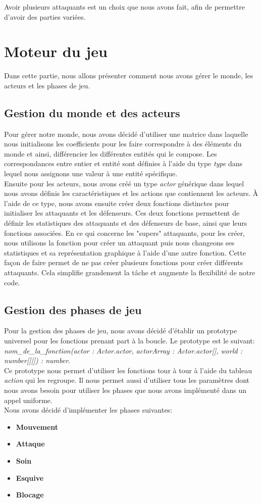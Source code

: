 \documentclass{article}
\begin{document}
Avoir plusieurs attaquants est un choix que nous avons fait, afin de permettre d'avoir des parties variées.
\newpage
\section{Moteur du jeu}
Dans cette partie, nous allons présenter comment nous avons gérer le monde, les acteurs et les phases de jeu.
\label{engine}

\subsection{Gestion du monde et des acteurs}
Pour gérer notre monde, nous avons décidé d'utiliser une matrice dans laquelle nous initialisons les coefficients pour les faire correspondre à des éléments du monde et ainsi, différencier les différentes entités qui le compose. Les correspondances entre entier et entité sont définies à l'aide du type \textit{type} dans lequel nous assignons une valeur à une entité spécifique.
\\Ensuite pour les acteurs, nous avons créé un type \textit{actor} générique dans lequel nous avons définis les caractéristiques et les actions que contiennent les acteurs. À l'aide de ce type, nous avons ensuite créer deux fonctions distinctes pour initialiser les attaquants et les défenseurs. Ces deux fonctions permettent de définir les statistiques des attaquants et des défenseurs de base, ainsi que leurs fonctions associées. En ce qui concerne les "supers" attaquants, pour les créer, nous utilisons la fonction pour créer un attaquant puis nous changeons ses statistiques et sa représentation graphique à l'aide d'une autre fonction. Cette façon de faire permet de ne pas créer plusieurs fonctions pour créer différents attaquants. Cela simplifie grandement la tâche et augmente la flexibilité de notre code.
\subsection{Gestion des phases de jeu}
Pour la gestion des phases de jeu, nous avons décidé d'établir un prototype universel pour les fonctions prenant part à la boucle. Le prototype est le suivant: \\\textit{nom\_de\_la\_fonction(actor : Actor.actor, actorArray : Actor.actor[], world : number[][]) : number}.
\\Ce prototype nous permet d'utiliser les fonctions tour à tour à l'aide du tableau \textit{action} qui les regroupe. Il nous permet aussi d'utiliser tous les paramètres dont nous avons besoin pour utiliser les phases que nous avons implémenté dans un appel uniforme.
\\Nous avons décidé d'implémenter les phases suivantes: 
\begin{itemize}
    \item \textbf{Mouvement}
    \item \textbf{Attaque}
    \item \textbf{Soin}    
    \item \textbf{Esquive}
    \item \textbf{Blocage}
\end{itemize}
\end{document}
